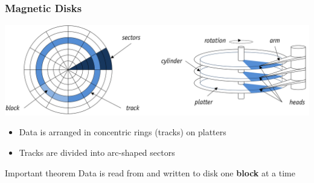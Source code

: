 \begin{frame}
    \frametitle{Magnetic Disks}
    \includegraphics[width=1\linewidth]{assets/images/magneticDisks.png}
    \begin{itemize}
        \item Data is arranged in concentric rings (tracks) on platters 
        \item Tracks are divided into arc-shaped sectors
    \end{itemize}
    \begin{alertblock}{Important theorem}
        Data is read from and written to disk one \textbf{block} at a time
        \end{alertblock}
\end{frame}